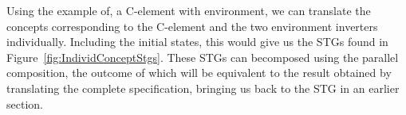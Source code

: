 \documentclass[british, journal]{IEEEtran}
\begin{document}
Using the example of, a C-element with
environment,
we can translate the concepts corresponding to the C-element and the two
environment inverters individually. Including the initial states, this would
give us the STGs found in Figure~\ref{fig:IndividConceptStgs}. These STGs 
can becomposed using the parallel composition, the outcome of which will be equivalent
to the result obtained by translating the complete specification, bringing us
back
to the STG in an earlier section. 

%
%
%
%
%
\end{document}
